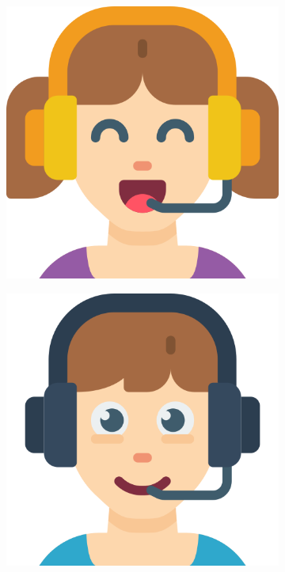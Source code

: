 \begin{figure}[h]
\begin{subfigure}{.1\textwidth}
        \includegraphics[width=.8\linewidth]{images/icons/006-gamer.png}
    \end{subfigure}
    \begin{subfigure}{.1\textwidth}
        \centering
        \includegraphics[width=.8\linewidth]{images/icons/007-gamer.png}
    \end{subfigure}
    \begin{subfigure}{.1\textwidth}
        \centering

\end{subfigure}
\end{figure}
